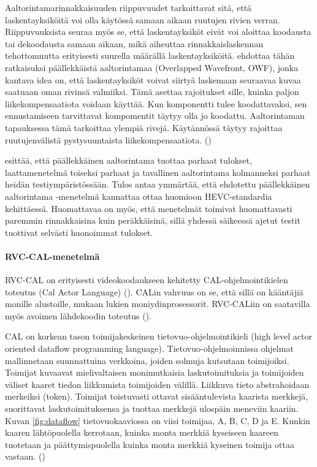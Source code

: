 Aaltorintamarinnakkaisuuden riippuvuudet tarkoittavat sitä, että
laskentayksiköitä voi olla käytössä samaan aikaan ruutujen rivien verran.
Riippuvuuksista seuraa myös se, että laskentayksiköt eivät voi aloittaa
koodausta tai dekoodausta samaan aikaan, mikä aiheuttaa rinnakkaislaskennan
tehottomuutta erityisesti suurella määrällä laskentayksiköitä.
\citealt{chi} ehdottaa tähän ratkaisuksi päällekkäistä
aaltorintamaa (Overlapped Wavefront, OWF), jonka kantava idea on, että
laskentayksiköt voivat siirtyä laskemaan seuraavaa kuvaa saatuaan oman rivinsä
valmiiksi. Tämä asettaa rajoitukset sille, kuinka paljon liikekompensaatiota
voidaan käyttää. Kun komponentti tulee koodattavaksi, sen ennustamiseen
tarvittavat kompomentit täytyy olla jo koodattu. Aaltorintaman tapauksessa
tämä tarkoittaa ylempiä rivejä. Käytännössä täytyy rajoittaa ruutujenvälistä
pystysuuntaista liikekompensaatiota. (\citealt{chi})

\citealt{chi} esittää, että päällekkäinen aaltorintama tuottaa parhaat tulokset,
laattamenetelmä toiseksi parhaat ja tavallinen aaltorintama kolmanneksi parhaat
heidän testiympäristössään. Tulos antaa ymmärtää, että ehdotettu päällekkäinen
aaltorintama -menetelmä kannattaa ottaa huomioon HEVC-standardia kehittäessä.
Huomattavaa on myös, että menetelmät toimivat huomattavasti paremmin
rinnakkaisina kuin peräkkäisinä, sillä yhdessä säikeessä ajetut testit
tuottivat selvästi huonoimmat tulokset.

\paragraph{RVC-CAL-menetelmä}
RVC-CAL on erityisesti videokoodaukseen kehitetty
CAL-ohjelmointikielen toteutus (Cal Actor Language) (\citealt{rvc}). CALin vahvuus on se, että
sillä on kääntäjiä monille alustoille, mukaan lukien moniydinprosessorit.
RVC-CALiin on saatavilla myös avoimen lähdekoodin toteutus (\citealt{orcc}).

CAL on korkean tason toimijakeskeinen tietovuo-ohjelmointikieli (high level
actor oriented dataflow programming language). Tietovuo-ohjelmoinnissa ohjelmat
mallinnetaan suunnattuina verkkoina, joiden solmuja kutsutaan toimijoiksi.
Toimijat kuvaavat mielivaltaisen monimutkaisia laskutoimituksia ja toimijoiden
väliset kaaret tiedon liikkumista toimijoiden välillä. Liikkuva tieto
abstrahoidaan merkeiksi (token). Toimijat toistuvasti ottavat sisääntulevista kaarista
merkkejä, suorittavat laskutoimituksensa ja tuottaa merkkejä ulospäin
meneviin kaariin. Kuvan \ref{fig:dataflow} tietovuokaaviossa on viisi toimijaa,
A, B, C, D ja E. Kunkin kaaren lähtöpuolella kerrotaan, kuinka monta merkkiä
kyseiseen kaareen tuotetaan ja päättymispuolella kuinka monta merkkiä kyseinen
toimija ottaa vastaan. (\citealt{rvc})


